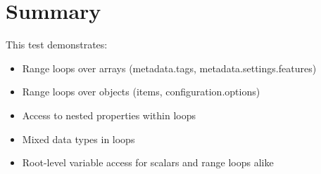\documentclass{article}
\begin{document}
\section{Summary}
This test demonstrates:
\begin{itemize}
\item Range loops over arrays (metadata.tags, metadata.settings.features)
\item Range loops over objects (items, configuration.options)
\item Access to nested properties within loops
\item Mixed data types in loops
\item Root-level variable access for scalars and range loops alike
\end{itemize}
\end{document}
